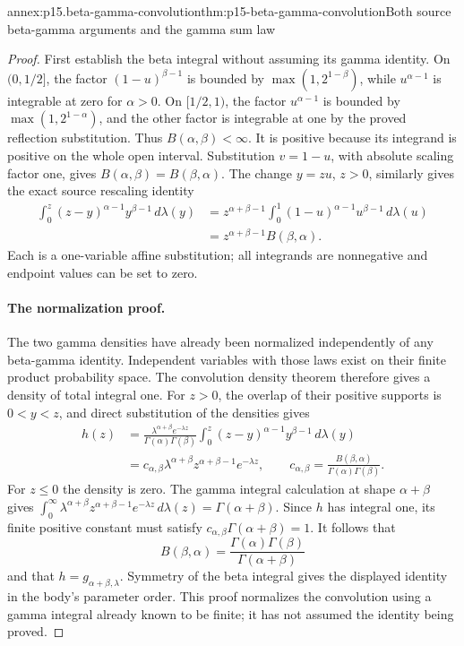 \begin{annexitem}{annex:p15.beta-gamma-convolution}{thm:p15-beta-gamma-convolution}{Both source beta-gamma arguments and the gamma sum law}
\begin{proof}
First establish the beta integral without assuming its gamma
identity. On \((0,1/2]\), the factor \((1-u)^{\beta-1}\)
is bounded by \(\max(1,2^{1-\beta})\), while
\(u^{\alpha-1}\) is integrable at zero for \(\alpha>0\).
On \([1/2,1)\), the factor \(u^{\alpha-1}\) is bounded
by \(\max(1,2^{1-\alpha})\), and the other factor is
integrable at one by the proved reflection substitution. Thus
\(B(\alpha,\beta)<\infty\). It is positive because its
integrand is positive on the whole open interval. Substitution
\(v=1-u\), with absolute scaling factor one, gives
\(B(\alpha,\beta)=B(\beta,\alpha)\).
The change \(y=zu\), \(z>0\), similarly gives the exact
source rescaling identity
\[
 \begin{aligned}
 \int_0^z(z-y)^{\alpha-1}y^{\beta-1}\,d\lambda(y)
  &=z^{\alpha+\beta-1}
               \int_0^1(1-u)^{\alpha-1}u^{\beta-1}\,d\lambda(u)\\
  &=z^{\alpha+\beta-1}B(\beta,\alpha).
 \end{aligned}
\]
Each is a one-variable affine substitution; all integrands are
nonnegative and endpoint values can be set to zero.

\paragraph{The normalization proof.}
The two gamma densities have already been normalized independently
of any beta-gamma identity. Independent variables with those laws
exist on their finite product probability space. The convolution
density theorem therefore gives a density of total integral one.
For \(z>0\), the overlap of their positive supports is \(0<y<z\),
and direct substitution of the densities gives
\[
 \begin{aligned}
 h(z)
  &=\frac{\lambda^{\alpha+\beta}e^{-\lambda z}}
           {\Gamma(\alpha)\Gamma(\beta)}
            \int_0^z(z-y)^{\alpha-1}y^{\beta-1}\,d\lambda(y)\\
  &=c_{\alpha,\beta}\lambda^{\alpha+\beta}
                     z^{\alpha+\beta-1}e^{-\lambda z},
 \qquad
 c_{\alpha,\beta}=\frac{B(\beta,\alpha)}
                         {\Gamma(\alpha)\Gamma(\beta)}.
 \end{aligned}
\]
For \(z\leq0\) the density is zero. The gamma integral
calculation at shape \(\alpha+\beta\) gives
\(\int_0^\infty\lambda^{\alpha+\beta}z^{\alpha+\beta-1}
e^{-\lambda z}\,d\lambda(z)=\Gamma(\alpha+\beta)\).
Since \(h\) has integral one, its finite positive constant must
satisfy \(c_{\alpha,\beta}\Gamma(\alpha+\beta)=1\).
It follows that
\[
 B(\beta,\alpha)=
       \frac{\Gamma(\alpha)\Gamma(\beta)}{\Gamma(\alpha+\beta)}
\]
and that \(h=g_{\alpha+\beta,\lambda}\). Symmetry of the
beta integral gives the displayed identity in the body's parameter
order. This proof normalizes the convolution using a gamma integral
already known to be finite; it has not assumed the identity being proved.


\end{proof}
\end{annexitem}
